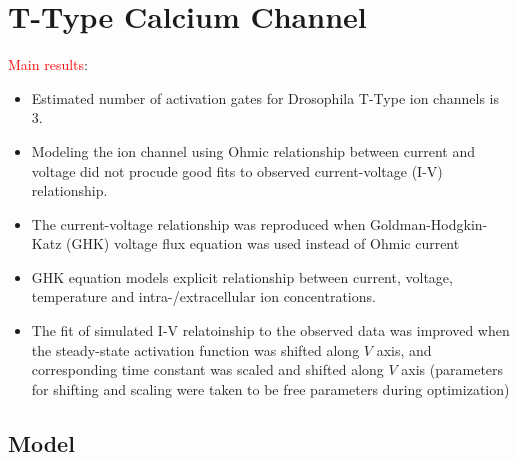 \documentclass[../../workflow.tex]{subfiles}
\begin{document}
\section{T-Type Calcium Channel}
\etocignoretoctocdepth %
\etocsettocstyle{\subsection*{\contentsname}}{}
\localtableofcontents


\newpage
\color{orange}

\textcolor{red}{Main results}:
\begin{itemize}
    \item Estimated number of activation gates for Drosophila T-Type ion channels is 3.
    \item Modeling the ion channel using Ohmic relationship between current and voltage
    did not procude good fits to observed current-voltage (I-V) relationship.
    \item The current-voltage relationship was reproduced when
    Goldman-Hodgkin-Katz (GHK) voltage flux equation was used instead of Ohmic current
    \item GHK equation models explicit relationship between current, voltage, temperature and
    intra-/extracellular ion concentrations.
    \item The fit of simulated I-V relatoinship to the observed data was improved when
    the steady-state activation function was shifted along $V$ axis,
    and corresponding time constant was scaled and shifted along $V$ axis (parameters for
    shifting and scaling were taken to be free parameters during optimization)
\end{itemize}

\color{black}

\subsection{Model}
\end{document}
